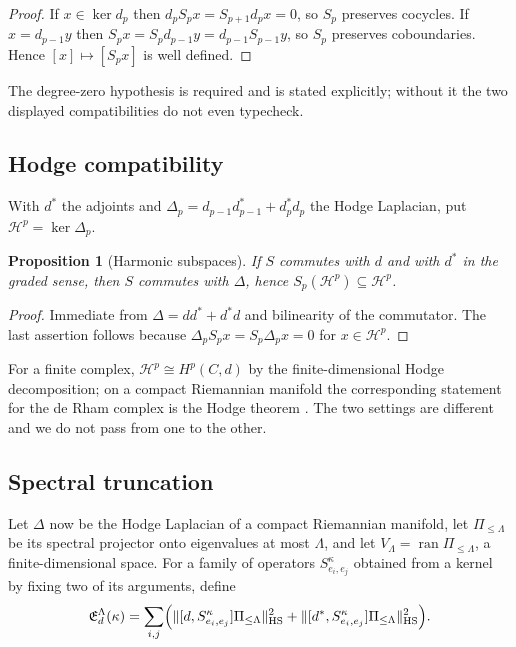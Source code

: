 \documentclass[11pt]{amsart}
\newtheorem{proposition}[theorem]{Proposition}
\theoremstyle{definition}
\theoremstyle{remark}
\newcommand{\ran}{\operatorname{ran}}
\newcommand{\norm}[1]{\lVert#1\rVert}
\newcommand{\Energy}{\mathfrak E}
\begin{document}
\begin{proof}
If $x\in\ker d_p$ then $d_pS_px=S_{p+1}d_px=0$, so $S_p$ preserves cocycles. If
$x=d_{p-1}y$ then $S_px=S_pd_{p-1}y=d_{p-1}S_{p-1}y$, so $S_p$ preserves coboundaries.
Hence $[x]\mapsto[S_px]$ is well defined.
\end{proof}

The degree-zero hypothesis is required and is stated explicitly; without it the two
displayed compatibilities do not even typecheck.

\subsection{Hodge compatibility}

With $d^{*}$ the adjoints and $\Delta_p=d_{p-1}d_{p-1}^{*}+d_p^{*}d_p$ the Hodge
Laplacian, put $\mathcal H^{p}=\ker\Delta_p$.

\begin{proposition}[Harmonic subspaces]
\label{prop:hodge}
If $S$ commutes with $d$ and with $d^{*}$ in the graded sense, then $S$ commutes with
$\Delta$, hence $S_p(\mathcal H^{p})\subseteq\mathcal H^{p}$.
\end{proposition}

\begin{proof}
Immediate from $\Delta=dd^{*}+d^{*}d$ and bilinearity of the commutator. The last
assertion follows because $\Delta_pS_px=S_p\Delta_px=0$ for $x\in\mathcal H^{p}$.
\end{proof}

For a finite complex, $\mathcal H^{p}\cong H^{p}(C,d)$ by the finite-dimensional Hodge
decomposition; on a compact Riemannian manifold the corresponding statement for the de
Rham complex is the Hodge theorem \cite[Ch.~6]{Warner1983}. The two settings are different
and we do not pass from one to the other.

\subsection{Spectral truncation}

Let $\Delta$ now be the Hodge Laplacian of a compact Riemannian manifold, let
$\Pi_{\le\Lambda}$ be its spectral projector onto eigenvalues at most $\Lambda$, and let
$V_\Lambda=\ran\Pi_{\le\Lambda}$, a finite-dimensional space. For a family of operators
$S^{\kappa}_{e_i,e_j}$ obtained from a kernel by fixing two of its arguments, define
\[
 \Energy_d^{\Lambda}(\kappa)
 =\sum_{i,j}\Bigl(
 \norm{[d,S^{\kappa}_{e_i,e_j}]\Pi_{\le\Lambda}}_{\mathrm{HS}}^{2}
 +\norm{[d^{*},S^{\kappa}_{e_i,e_j}]\Pi_{\le\Lambda}}_{\mathrm{HS}}^{2}\Bigr).
\]
\end{document}
